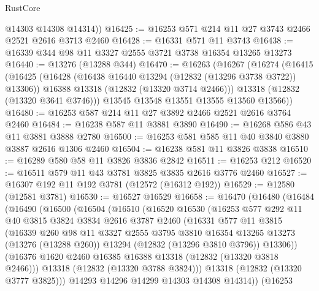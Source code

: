 \begin{lexlean}{RustCore}
\begin{coremodule}
        @14303
        @14308
        @14314))
@16425 := @16253 @571 @214 @11 @27 @3743 @2466 @2521 @2616 @3713 @2460
@16428 := @16331 @571 @11 @3743
@16438 := @16339 @344 @98 @11 @3327 @2555 @3721 @3738 @16354 @13265 @13273
@16440 := @13276 (@13288 @344)
@16470 := @16263
    (@16267
      (@16274
        (@16415
          (@16425
            (@16428 (@16438 @16440 @13294 (@12832 (@13296 @3738 @3722)) @13306))
            @16388
            @13318
            (@12832 (@13320 @3714 @2466)))
          @13318
          (@12832 (@13320 @3641 @3746)))
        @13545
        @13548
        @13551
        @13555
        @13560
        @13566))
@16480 := @16253 @587 @214 @11 @27 @3892 @2466 @2521 @2616 @3764 @2460
@16484 := @16238 @587 @11 @3881 @3890
@16490 := @16268 @586 @43 @11 @3881 @3888 @2780
@16500 := @16253 @581 @585 @11 @40 @3840 @3880 @3887 @2616 @1306 @2460
@16504 := @16238 @581 @11 @3826 @3838
@16510 := @16289 @580 @58 @11 @3826 @3836 @2842
@16511 := @16253 @212
@16520 := @16511 @579 @11 @43 @3781 @3825 @3835 @2616 @3776 @2460
@16527 := @16307 @192 @11 @192 @3781 (@12572 (@16312 @192))
@16529 := @12580 (@12581 @3781)
@16530 := @16527 @16529
@16658 := @16470
    (@16480
      (@16484
        (@16490
          (@16500
            (@16504
              (@16510
                (@16520
                  @16530
                  (@16253
                    @577
                    @292
                    @11
                    @40
                    @3815
                    @3824
                    @3834
                    @2616
                    @3787
                    @2460
                    (@16331
                      @577
                      @11
                      @3815
                      (@16339
                        @260
                        @98
                        @11
                        @3327
                        @2555
                        @3795
                        @3810
                        @16354
                        @13265
                        @13273
                        (@13276 (@13288 @260))
                        @13294
                        (@12832 (@13296 @3810 @3796))
                        @13306))
                    (@16376 @1620 @2460 @16385 @16388 @13318 (@12832 (@13320 @3818 @2466)))
                    @13318
                    (@12832 (@13320 @3788 @3824)))
                  @13318
                  (@12832 (@13320 @3777 @3825)))
                @14293
                @14296
                @14299
                @14303
                @14308
                @14314))
            (@16253

\end{coremodule}
\end{lexlean}
